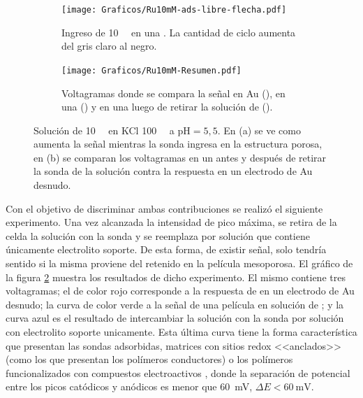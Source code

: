 			\begin{figure}[th]
				\begin{subfigure}[t]{0.495\textwidth}
				\texttt{[image: Graficos/Ru10mM-ads-libre-flecha.pdf]}
		        \caption{Ingreso de \ru\space \SI{10}{\milli\Molar} en una \pdmF. La cantidad de ciclo aumenta del gris  claro al negro.}
		        \label{fig:Ru10mM_ingreso}
		      	\end{subfigure}
		      	\begin{subfigure}[t]{0.495\textwidth}
				\texttt{[image: Graficos/Ru10mM-Resumen.pdf]}
		        \caption{Voltagramas donde se compara la señal en Au (\usebox{\punteado}), en una \pdmF\space(\usebox{\gris}) y en una \pdmF\space luego de retirar la solución de \ru (\usebox{\negro}).}
		        \label{fig:Ru10mM-resumen}
		      	\end{subfigure}
		      	\caption[Adsorción de sonda positiva en \pdmF]{Solución de \ru\space \SI{10}{\milli\Molar} en KCl \SI{100}{\milli\Molar} a $\text{pH}=5,5$. En (a) se ve como aumenta la señal mientras la sonda ingresa en la estructura porosa, en (b) se comparan los voltagramas en un \pdmF\space antes y después de retirar la sonda de la solución contra la respuesta en un electrodo de Au desnudo.}
		      	\label{fig:primero-Ru10mM}
		      	\end{figure}

		Con el objetivo de discriminar ambas contribuciones se realizó el siguiente experimento. Una vez alcanzada la intensidad de pico máxima, se retira de la celda la solución con la sonda y se reemplaza por solución que contiene únicamente electrolito soporte. De esta forma, de existir señal, solo tendría sentido si la misma proviene del \ru\space retenido en la película mesoporosa. El gráfico de la figura \ref{fig:Ru10mM-resumen} muestra los resultados de dicho experimento. El mismo contiene tres voltagramas; el de color rojo corresponde a la respuesta de \ru\space en un electrodo de Au desnudo; la curva de color verde a la señal de una película en solución de \ru; y la curva azul es el resultado de intercambiar la solución con la sonda por solución con electrolito soporte unicamente. Esta última curva tiene la forma característica que presentan las sondas adsorbidas, matrices con sitios redox <<anclados>>\cite{Ybarra2005} (como los que presentan los polímeros conductores) o los polímeros funcionalizados con compuestos electroactivos \cite{Rohlfing2005,Vila2015}, donde la separación de potencial entre los picos catódicos y anódicos es menor que \SI{60}{\milli\volt}, $\Delta E < \SI{60}{\milli\volt}$\cite{Wi2000}.

